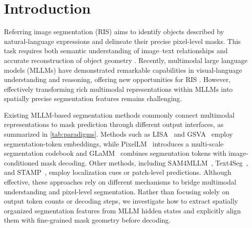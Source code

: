
\section{Introduction}
\label{sec:intro}

Referring image segmentation (RIS) aims to identify
objects described by natural-language expressions
and delineate their precise pixel-level masks.
This task requires both semantic understanding
of image--text relationships and accurate
reconstruction of object geometry
\cite{Yu2016ModelingContext,Mao2016RefCOCOg,Liu2023GRES}.
Recently, multimodal large language models (MLLMs)
have demonstrated remarkable capabilities in
visual-language understanding and reasoning,
offering new opportunities for RIS
\cite{Liu2023LLaVA,Bai2025Qwen3VL}.
However, effectively transforming rich multimodal
representations within MLLMs into spatially
precise segmentation features remains challenging.

Existing MLLM-based segmentation methods commonly
connect multimodal representations to mask prediction
through different output interfaces, as summarized
in \cref{tab:paradigms}. Methods such as
LISA~\cite{Lai2024LISA} and
GSVA~\cite{Xia2024GSVA} employ segmentation-token
embeddings, while PixelLM~\cite{Ren2024PixelLM}
introduces a multi-scale segmentation codebook and
GLaMM~\cite{Rasheed2024GLaMM} combines segmentation
tokens with image-conditioned mask decoding.
Other methods, including
SAM4MLLM~\cite{Chen2024SAM4MLLM},
Text4Seg~\cite{Lan2025Text4Seg}, and
STAMP~\cite{Liu2026STAMP},
employ localization cues or patch-level predictions.
Although effective, these approaches rely on
different mechanisms to bridge multimodal understanding
and pixel-level segmentation.
Rather than focusing solely on output token counts
or decoding steps, we investigate how to extract
spatially organized segmentation features from
MLLM hidden states and explicitly align them with
fine-grained mask geometry before decoding.

